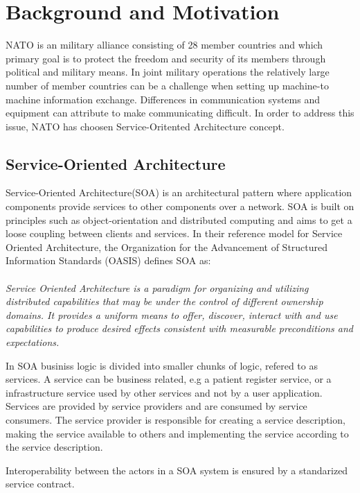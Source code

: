\documentclass[USenglish]{article}
\begin{document}
\section{Background and Motivation}
NATO is an military alliance consisting of 28 member countries\cite{nato-homepage-member-countries} and which primary goal is to protect the freedom and security of its members through political and military means. In joint military operations the relatively large number of member countries can be a challenge when setting up machine-to machine information exchange. Differences in communication systems and equipment can attribute to make communicating difficult. In order to address this issue, NATO has choosen Service-Oritented Architecture concept.

\subsection{Service-Oriented Architecture}
Service-Oriented Architecture(SOA) is an architectural pattern where application components provide services to other components over a network. SOA is built on principles such as object-orientation and distributed computing and aims to get a loose coupling between clients and services. In their reference model for Service Oriented Architecture\cite{oasis-soa-reference-model}, the 
Organization for the Advancement of Structured Information Standards (OASIS) defines SOA as: 
\paragraph{}
\textit{Service Oriented Architecture is a paradigm for organizing and utilizing distributed capabilities that may be under the control of different ownership domains. It provides a uniform means to offer, discover, interact with and use capabilities to produce desired effects consistent with measurable preconditions and expectations.}

In SOA businiss logic is divided into smaller chunks of logic, refered to as services. A service can be business related, e.g a patient register service, or a infrastructure service used by other services and not by a user application.  Services are provided by service providers and are consumed by service consumers. The service provider is responsible for creating a service description, making the service available to others and implementing the service according to the service description. 

Interoperability between the actors in a SOA system is ensured by a standarized service contract. 
\end{document}
